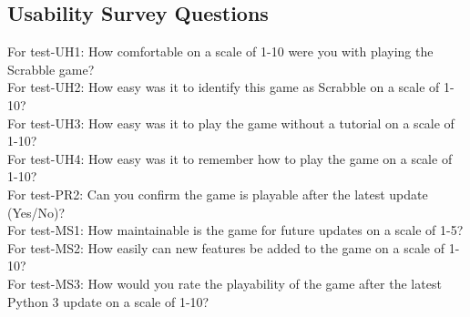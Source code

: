 \documentclass[12pt, titlepage]{article}
\begin{document}
\subsection{Usability Survey Questions}
For test-UH1: How comfortable on a scale of 1-10 were you with playing the Scrabble game?\\
For test-UH2: How easy was it to identify this game as Scrabble on a scale of 1-10?\\
For test-UH3: How easy was it to play the game without a tutorial on a scale of 1-10?\\
For test-UH4: How easy was it to remember how to play the game on a scale of 1-10?\\
For test-PR2: Can you confirm the game is playable after the latest update (Yes/No)?\\
For test-MS1: How maintainable is the game for future updates on a scale of 1-5?\\
For test-MS2: How easily can new features be added to the game on a scale of 1-10?\\
For test-MS3: How would you rate the playability of the game after the latest Python 3 update on a scale of 1-10?\\
\end{document}
